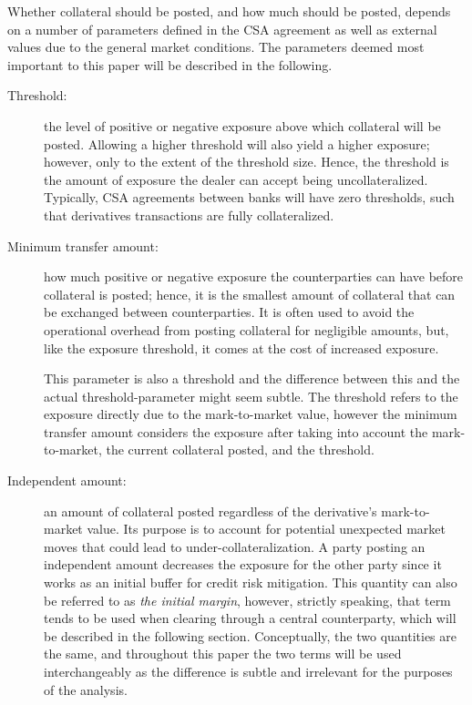 \documentclass[main.tex]{subfiles}
\begin{document}
        Whether collateral should be posted, and how much should be posted, 
        depends on a number of parameters defined in the CSA agreement
        as well as external values due to the general market conditions.
        The parameters deemed most important to this paper will be described in the following.
        \begin{description}
            \item[Threshold:] 
            the level of positive or negative exposure above which collateral will be posted. 
            Allowing a higher threshold will also yield a higher exposure;
            however, only to the extent of the threshold size. 
            Hence, the threshold is the amount of exposure the dealer can accept being uncollateralized.
            Typically, CSA agreements between banks will have zero thresholds, 
            such that derivatives transactions are fully collateralized.
            
            \item[Minimum transfer amount:] 
            how much positive or negative exposure the counterparties can have before collateral is posted;
            hence, it is the smallest amount of collateral that can be exchanged between counterparties.
            It is often used to avoid the operational overhead from posting collateral for negligible amounts,
            but, like the exposure threshold, it comes at the cost of increased exposure.

            This parameter is also a threshold and the difference between this
            and the actual threshold-parameter might seem subtle.
            The threshold refers to the exposure directly due to the mark-to-market value,
            however the minimum transfer amount considers the exposure after taking into 
            account the mark-to-market, the current collateral posted, and the threshold.

            \item[Independent amount:]
            an amount of collateral posted regardless of the derivative's mark-to-market value. 
            Its purpose is to account for potential unexpected market moves
            that could lead to under-collateralization.
            A party posting an independent amount decreases the exposure for the other party
            since it works as an initial buffer for credit risk mitigation.
            This quantity can also be referred to as \textit{the initial margin}, 
            however, strictly speaking, 
            that term tends to be used when clearing through a central counterparty,
            which will be described in the following section.
            Conceptually, the two quantities are the same, and throughout this paper
            the two terms will be used interchangeably as the difference is subtle
            and irrelevant for the purposes of the analysis. 


\end{description}
\end{document}
